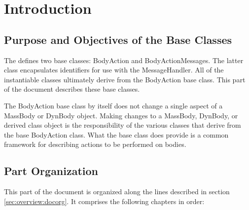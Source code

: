 %
\chapter{Introduction}\label{ch:BodyAction:intro}

\section{Purpose and Objectives of the \ModelDesc Base Classes}
The \ModelDesc defines two base classes: BodyAction and BodyActionMessages.
The latter class encapsulates identifiers for use with the MessageHandler.
All of the instantiable \ModelDesc classes ultimately derive from the BodyAction
base class. This part of the document describes these base classes.

The BodyAction base class by itself does not change a single aspect of
a MassBody or DynBody object. Making changes to a MassBody, DynBody, or derived class object is the
responsibility of the various classes that derive from the base BodyAction
class. What the base class does provide is a common framework for describing
actions to be  performed on bodies.

\section{Part Organization}
This part of the \ModelDesc document is organized along the
lines described in section \ref{sec:overview:docorg}. It
comprises the following chapters in order:

